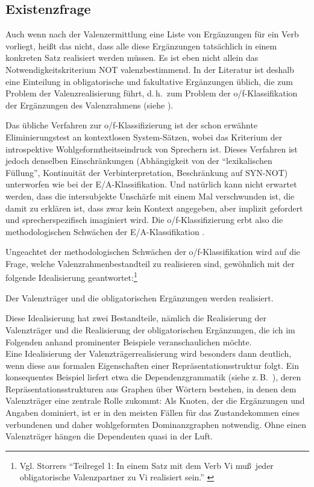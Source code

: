 \subsection{Existenzfrage} \label{sec-existenzfrage}

Auch wenn nach der Valenzermittlung eine Liste von Ergänzungen für ein Verb vorliegt, hei\ss t das nicht, dass alle diese Ergänzungen tatsächlich in einem konkreten Satz realisiert werden müssen. Es ist eben nicht allein das Notwendigkeitskriterium NOT valenzbestimmend. In der Literatur ist deshalb eine Einteilung in obligatorische und fakultative Ergänzungen üblich, die zum Problem der Valenzrealisierung führt, d.\,h.\ zum Problem der o/f-Klassifikation der Ergänzungen des Valenzrahmens (siehe \citealt[95ff]{Storrer:92}). 

Das übliche Verfahren zur o/f-Klassifizierung ist der schon erwähnte Eliminierungstest an kontextlosen System-Sätzen, wobei das Kriterium der introspektive Wohlgeformtheitseindruck von Sprechern ist. Dieses Verfahren ist jedoch denselben Einschränkungen (Abhängigkeit von der "`lexikalischen Füllung"', Kontinuität der Verb\-interpretation, Beschränkung auf SYN-NOT) unterworfen wie bei der E/A-Klassifikation. Und natürlich kann nicht erwartet werden, dass die intersubjekte Unschärfe mit einem Mal verschwunden ist, die damit zu erklären ist, dass zwar kein Kontext angegeben, aber implizit gefordert und sprecherspezifisch imaginiert wird. Die o/f-Klassifizierung erbt also die methodologischen Schwächen der E/A-Klassifikation \citep[240ff]{Storrer:92}.

Ungeachtet der methodologischen Schwächen der o/f-Klassifikation wird auf die Frage, welche Valenzrahmenbestandteil zu realisieren sind, gewöhnlich mit der folgende Idealisierung geantwortet:\footnote{Vgl. Storrers "`Teilregel 1: In einem Satz mit dem Verb Vi mu\ss\ jeder obligatorische Valenzpartner zu Vi realisiert sein."' \citep[110]{Storrer:92}}  

\begin{idealisierung} 
Der Valenzträger und die obligatorischen Ergänzungen werden realisiert.
\end{idealisierung} 
Diese Idealisierung hat zwei Bestandteile, nämlich die Realisierung der Valenzträger und die Realisierung der obligatorischen Ergänzungen, die ich im Folgenden anhand prominenter Beispiele veranschaulichen möchte. \\

Eine Idealisierung der Valenzträgerrealisierung wird besonders dann deutlich, wenn diese aus formalen Eigenschaften einer Repräsentationsstruktur folgt. Ein konsequentes Beispiel liefert etwa die Dependenzgrammatik (siehe z.\,B.\ \citealt{Engel:88,Heringer:93,Eroms:00}), deren Repräsentationsstrukturen aus Graphen über Wörtern bestehen, in denen dem Valenzträger eine zentrale Rolle zukommt: Als Knoten, der die Ergänzungen und Angaben dominiert, ist er in den meisten Fällen für das Zustandekommen eines verbundenen und daher wohlgeformten Dominanzgraphen notwendig. Ohne einen Valenzträger hängen die Dependenten quasi in der Luft. 

